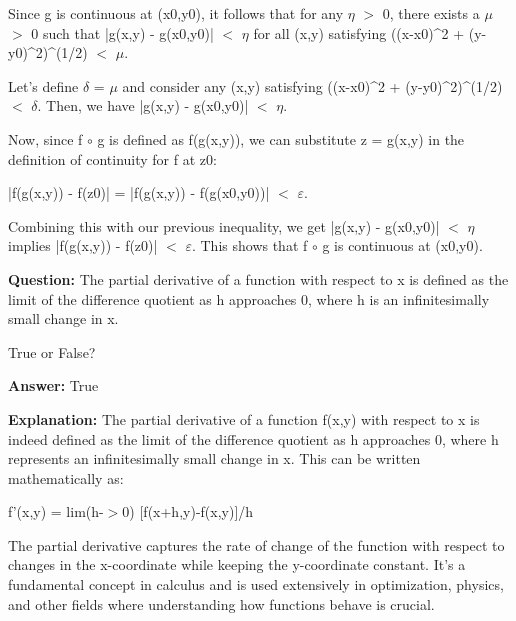 \documentclass{article}
\begin{document}
Since g is continuous at (x0,y0), it follows that for any \ensuremath{\eta} \ensuremath{>} 0, there exists a \ensuremath{\mu} \ensuremath{>} 0 such that |g(x,y) - g(x0,y0)| \ensuremath{<} \ensuremath{\eta} for all (x,y) satisfying ((x-x0){\textasciicircum}2 + (y-y0){\textasciicircum}2){\textasciicircum}(1/2) \ensuremath{<} \ensuremath{\mu}.

Let's define \ensuremath{\delta} = \ensuremath{\mu} and consider any (x,y) satisfying ((x-x0){\textasciicircum}2 + (y-y0){\textasciicircum}2){\textasciicircum}(1/2) \ensuremath{<} \ensuremath{\delta}. Then, we have |g(x,y) - g(x0,y0)| \ensuremath{<} \ensuremath{\eta}.

Now, since f \ensuremath{\circ} g is defined as f(g(x,y)), we can substitute z = g(x,y) in the definition of continuity for f at z0:

|f(g(x,y)) - f(z0)| = |f(g(x,y)) - f(g(x0,y0))| \ensuremath{<} \ensuremath{\varepsilon}.

Combining this with our previous inequality, we get |g(x,y) - g(x0,y0)| \ensuremath{<} \ensuremath{\eta} implies |f(g(x,y)) - f(z0)| \ensuremath{<} \ensuremath{\varepsilon}. This shows that f \ensuremath{\circ} g is continuous at (x0,y0).
                
                \vspace{0.5cm} 
        
            
        
            
                \textbf {Question:} The partial derivative of a function with respect to x is defined as the limit of the difference quotient as h approaches 0, where h is an infinitesimally small change in x.

True or False?
                
                \textbf{Answer:} True

                \textbf{Explanation:} The partial derivative of a function f(x,y) with respect to x is indeed defined as the limit of the difference quotient as h approaches 0, where h represents an infinitesimally small change in x. This can be written mathematically as:

f'(x,y) = lim(h-\ensuremath{>}0) [f(x+h,y)-f(x,y)]/h

The partial derivative captures the rate of change of the function with respect to changes in the x-coordinate while keeping the y-coordinate constant. It's a fundamental concept in calculus and is used extensively in optimization, physics, and other fields where understanding how functions behave is crucial.
                
\end{document}
